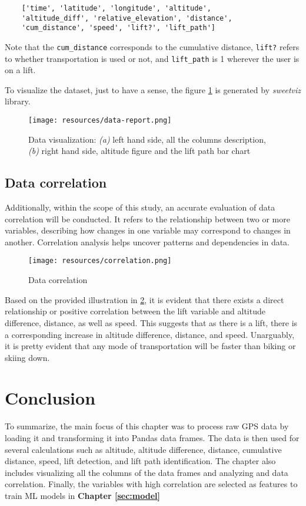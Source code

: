 \begin{verbatim}
    ['time', 'latitude', 'longitude', 'altitude',
    'altitude_diff', 'relative_elevation', 'distance',
    'cum_distance', 'speed', 'lift?', 'lift_path']
\end{verbatim}

Note that the \texttt{cum\_distance} corresponds to the cumulative distance, 
\texttt{lift?} refers to whether transportation is used or not, and 
\texttt{lift\_path} is 1 wherever the user is on a lift.

To visualize the dataset, just to have a sense, the figure \ref{fig:data-report} is generated by \textit{sweetviz} library. 


\begin{figure}[htb]
	\texttt{[image: resources/data-report.png]}
	\caption{Data visualization: \textit{(a)} left hand side, all the columns description, \textit{(b)} right hand side, altitude figure and the lift path bar chart}
	\label{fig:data-report}
\end{figure}

\subsection{Data correlation}
Additionally, within the scope of this study, an accurate evaluation of data correlation will be conducted. It refers to the relationship between two or more variables, describing how changes in one variable may correspond to changes in another. Correlation analysis helps uncover patterns and dependencies in data.



\begin{figure}[htb]
	\texttt{[image: resources/correlation.png]}
	\caption{Data correlation}
	\label{fig:correlation}
\end{figure}

Based on the provided illustration in  \ref{fig:correlation}, it is evident that there exists a direct relationship or positive correlation between the lift variable and altitude difference, distance, as well as speed. This suggests that as there is a lift, there is a corresponding increase in altitude difference, distance, and speed. Unarguably, it is pretty evident that any mode of transportation will be faster than biking or skiing down.

\section{Conclusion}
\label{sec:data:conclusion}

To summarize, the main focus of this chapter was to process raw GPS data by loading it and transforming it into Pandas data frames. The data is then used for several calculations such as altitude, altitude difference, distance, cumulative distance, speed, lift detection, and lift path identification. The chapter also includes visualizing all the columns of the data frames and analyzing and data correlation. Finally, the variables with high correlation are selected as features to train ML models in
\textbf{Chapter \ref{sec:model}}

